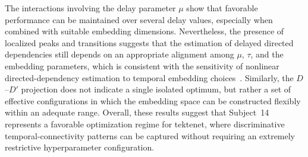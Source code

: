 {The interactions involving the delay parameter $\mu$ show that favorable performance can be maintained over several delay values, especially when combined with suitable embedding dimensions. Nevertheless, the presence of localized peaks and transitions suggests that the estimation of delayed directed dependencies still depends on an appropriate alignment among $\mu$, $\tau$, and the embedding parameters, which is consistent with the sensitivity of nonlinear directed-dependency estimation to temporal embedding choices~\cite{schreiber2000measuring,staniek2008symbolic}. Similarly, the $D$--$D'$ projection does not indicate a single isolated optimum, but rather a set of effective configurations in which the embedding space can be constructed flexibly within an adequate range. Overall, these results suggest that Subject~14 represents a favorable optimization regime for \gls{tektenet}, where discriminative temporal-connectivity patterns can be captured without requiring an extremely restrictive hyperparameter configuration.}
